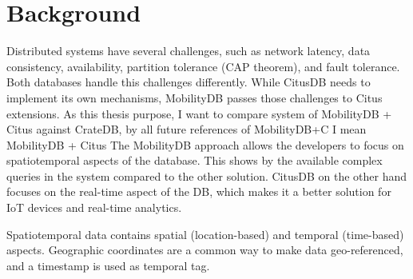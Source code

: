 \section{Background}
\label{cha:background}

Distributed systems have several challenges, such as network latency, data consistency, availability, partition tolerance (CAP theorem), and fault tolerance.
Both databases handle this challenges differently.
While CitusDB needs to implement its own mechanisms, MobilityDB passes those challenges to Citus extensions.
As this thesis purpose, I want to compare system of MobilityDB + Citus against CrateDB, by all future references of MobilityDB+C I mean MobilityDB + Citus
The MobilityDB approach allows the developers to focus on spatiotemporal aspects of the database.
This shows by the available complex queries in the system compared to the other solution.
CitusDB on the other hand focuses on the real-time aspect of the DB, which makes it a better solution for IoT devices and real-time analytics.

Spatiotemporal data contains spatial (location-based) and temporal (time-based) aspects.
Geographic coordinates are a common way to make data geo-referenced, and a timestamp is used as temporal tag. \cite{alamSurveySpatiotemporalData2022}

